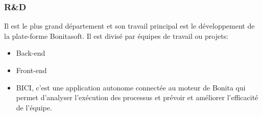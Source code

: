 \subsubsection{R\&D}
Il est le plus grand département et son travail principal est le développement de la plate-forme Bonitasoft.
Il est divisé par équipes de travail ou projets:
\begin{itemize}
  \item Back-end
  \item Front-end
  \item BICI, c'est une application autonome connectée au moteur de Bonita qui permet d'analyser l'exécution
   des processus et prévoir et améliorer l'efficacité de l'équipe.
\end{itemize}
